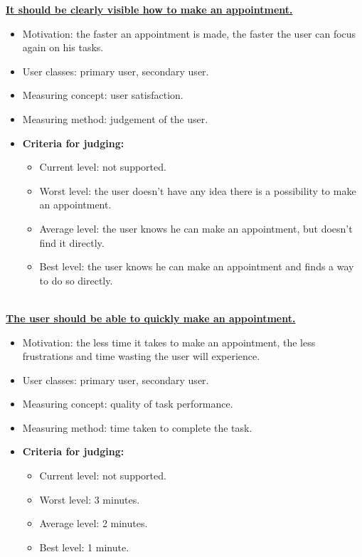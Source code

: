 \documentclass[11pt, a4paper,svglistings]{report}
\begin{document}
\textbf{\underline{It should be clearly visible how to make an appointment.}}
\begin{itemize}
\item{Motivation: the faster an appointment is made, the faster the user can focus again on his tasks.}
\item{User classes: primary user, secondary user.}
\item{Measuring concept: user satisfaction.}
\item{Measuring method: judgement of the user.}
\item{\textbf{Criteria for judging:}}
\begin{itemize}
\item{Current level: not supported.}
\item{Worst level: the user doesn't have any idea there is a possibility to make an appointment.}
\item{Average level: the user knows he can make an appointment, but doesn't find it directly.}
\item{Best level: the user knows he can make an appointment and finds a way to do so directly. \\ \\}
\end{itemize}
\end{itemize}
\textbf{\underline{The user should be able to quickly make an appointment.}}
\begin{itemize}
\item{Motivation: the less time it takes to make an appointment, the less frustrations and time wasting the user will experience.}
\item{User classes: primary user, secondary user.}
\item{Measuring concept: quality of task performance.}
\item{Measuring method: time taken to complete the task.}
\item{\textbf{Criteria for judging:}}
\begin{itemize}
\item{Current level: not supported.}
\item{Worst level: 3 minutes.}
\item{Average level: 2 minutes.}
\item{Best level: 1 minute. \\ \\}
\end{itemize}
\end{itemize}
\end{document}
